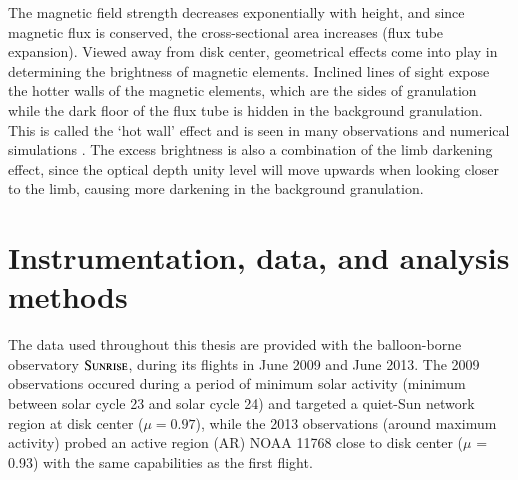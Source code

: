 \documentclass[goettingen, gauss, print]{thesis}
\begin{document}
 
The magnetic field strength decreases exponentially with height, and since magnetic flux is conserved, the cross-sectional area increases (flux tube expansion). Viewed away from disk center, geometrical effects come into play in determining the brightness of magnetic elements. Inclined lines of sight expose the hotter walls of the magnetic elements, which are the sides of granulation while the dark floor of the flux tube is hidden in the background granulation. This is called the `hot wall' effect and is seen in many observations and numerical simulations \citep{spruit_pressure_1976, topka_properties_1997,keller_origin_2004, steiner_recent_2005}. The excess brightness is also a combination of the limb darkening effect, since the optical depth unity level will move upwards when looking closer to the limb, causing more darkening in the background granulation.%

\chapter{Instrumentation, data, and analysis methods}
\label{chapter_2}

The data used throughout this thesis are provided with the balloon-borne observatory $\textsc{Sunrise}$, during its flights in June 2009 and June 2013. 
The 2009 observations occured during a period of minimum solar activity (minimum between solar cycle 23 and solar cycle 24) and targeted a quiet-Sun network region at disk center ($\mu=0.97$), while the 2013 observations (around maximum activity) probed an active region (AR) NOAA 11768 close to disk center ($\mu$ = 0.93) with the same capabilities as the first flight.
\end{document}

